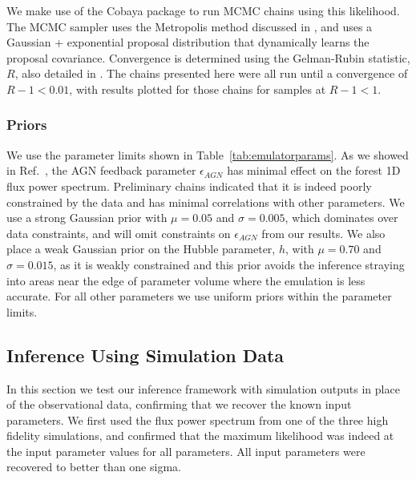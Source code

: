 We make use of the Cobaya package \cite{2021JCAP...05..057T, 2019ascl.soft10019T, 2013PhRvD..87j3529L, 2002PhRvD..66j3511L} to run MCMC chains using this likelihood.
The MCMC sampler uses the Metropolis method discussed in \cite{2013PhRvD..87j3529L}, and uses a Gaussian + exponential proposal distribution that dynamically learns the proposal covariance.
Convergence is determined using the Gelman-Rubin statistic, $R$, also detailed in \cite{2013PhRvD..87j3529L}.
The chains presented here were all run until a convergence of $R-1 < 0.01$, with results plotted for those chains for samples at $R-1 < 1$.

\subsubsection{Priors}

We use the parameter limits shown in Table~\ref{tab:emulatorparams}.
As we showed in Ref.~\cite{2023simsuite}, the AGN feedback parameter $\epsilon_{AGN}$ has minimal effect on the \Lya forest 1D flux power spectrum.
Preliminary chains indicated that it is indeed poorly constrained by the data and has minimal correlations with other parameters.
We use a strong Gaussian prior with $\mu = 0.05$ and $\sigma = 0.005$, which dominates over data constraints, and will omit constraints on $\epsilon_{AGN}$ from our results.
We also place a weak Gaussian prior on the Hubble parameter, $h$, with $\mu = 0.70$ and $\sigma = 0.015$, as it is weakly constrained and this prior avoids the inference straying into areas near the edge of parameter volume where the emulation is less accurate.
For all other parameters we use uniform priors within the parameter limits.

\subsection{Inference Using Simulation Data}\label{sec:simdat}

In this section we test our inference framework with simulation outputs in place of the observational data, confirming that we recover the known input parameters.
We first used the flux power spectrum from one of the three high fidelity simulations, and confirmed that the maximum likelihood was indeed at the input parameter values for all parameters.
All input parameters were recovered to better than one sigma.

